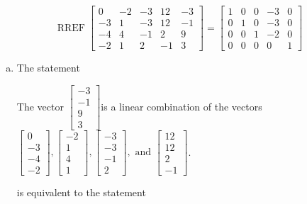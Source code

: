 \begin{exerciseAnswer} 
\[\operatorname{RREF}  \left[\begin{array}{cccc|c}
0 & -2 & -3 & 12 & -3 \\
-3 & 1 & -3 & 12 & -1 \\
-4 & 4 & -1 & 2 & 9 \\
-2 & 1 & 2 & -1 & 3
\end{array}\right] = \left[\begin{array}{cccc|c}
1 & 0 & 0 & -3 & 0 \\
0 & 1 & 0 & -3 & 0 \\
0 & 0 & 1 & -2 & 0 \\
0 & 0 & 0 & 0 & 1
\end{array}\right] \]
\begin{enumerate}[(a)]
\item  The statement 
\begin{center}\begin{minipage}{0.8\textwidth}
 The vector \( \left[\begin{array}{c}
-3 \\
-1 \\
9 \\
3
\end{array}\right] \)is a linear combination of the vectors \( \left[\begin{array}{c}
0 \\
-3 \\
-4 \\
-2
\end{array}\right] , \left[\begin{array}{c}
-2 \\
1 \\
4 \\
1
\end{array}\right] , \left[\begin{array}{c}
-3 \\
-3 \\
-1 \\
2
\end{array}\right] , \text{ and } \left[\begin{array}{c}
12 \\
12 \\
2 \\
-1
\end{array}\right] \). 
\end{minipage}\end{center}
     is equivalent to the statement 
\begin{center}\begin{minipage}{0.8\textwidth}

\end{minipage}
\end{center}
\end{enumerate}
\end{exerciseAnswer}
